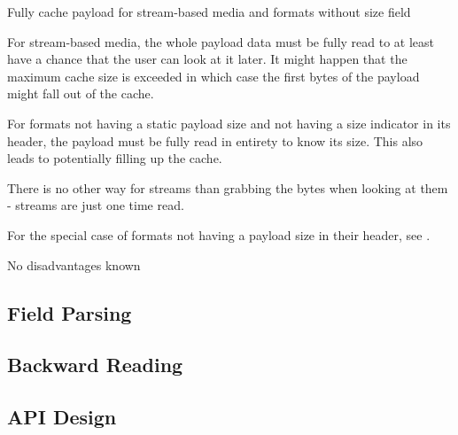 {%
Fully cache payload for stream-based media and formats without size field
}
{%
  For stream-based media, the whole payload data must be fully read to at least have a chance that the user can look at it later. It might happen that the maximum cache size is exceeded in which case the first bytes of the payload might fall out of the cache.

For formats not having a static payload size and not having a size indicator in its header, the payload must be fully read in entirety to know its size. This also leads to potentially filling up the cache. 
}
{%
  There is no other way for streams than grabbing the bytes when looking at them - streams are just one time read.

  For the special case of formats not having a payload size in their header, see .
}
{%
No disadvantages known
}

\subsection{Field Parsing}%
\label{sec:FieldParsing}%


\subsection{Backward Reading}%
\label{sec:BackwardReading}%

\subsection{API Design}%
\label{sec:APIDesign}%












%
%
